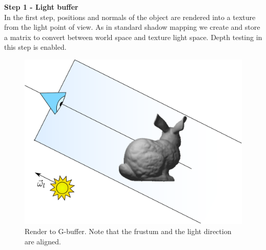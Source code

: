 \textbf{Step 1 - Light buffer} \\

In the first step, positions and normals of the object are rendered into a texture from the light point of view. As in standard shadow mapping we create and store a matrix to convert between world space and texture light space. Depth testing in this step is enabled.

\begin{figure}[!ht]
\centering
\includegraphics[width=0.8 \linewidth]{images/method/step1.pdf}
\caption{Render to G-buffer. Note that the frustum and the light direction are aligned.}
\label{fig:step1}
\end{figure} 


